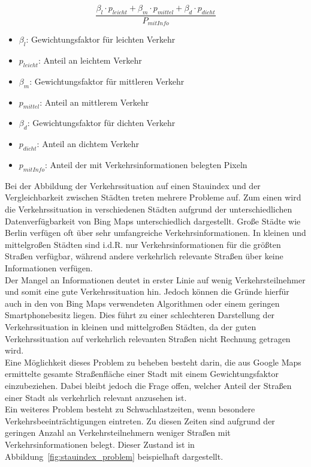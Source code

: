 \begin{equation}\label{eq:1}
\frac{\beta_l\cdot p_{leicht}+\beta_m\cdot p_{mittel}+\beta_d\cdot p_{dicht}}{P_{mit Info}}
\end{equation}
\begin{itemize}
\item $\beta_l$: Gewichtungsfaktor für leichten Verkehr
\item $p_{leicht}$: Anteil an leichtem Verkehr
\item $\beta_m$: Gewichtungsfaktor für mittleren Verkehr
\item $p_{mittel}$: Anteil an mittlerem Verkehr
\item $\beta_d$: Gewichtungsfaktor für dichten Verkehr
\item $p_{dicht}$: Anteil an dichtem Verkehr
\item $p_{mit Info}$: Anteil der mit Verkehrsinformationen belegten Pixeln
\end{itemize}

Bei der Abbildung der Verkehrssituation auf einen Stauindex und der Vergleichbarkeit zwischen Städten treten mehrere Probleme auf. Zum einen wird die Verkehrssituation in verschiedenen Städten aufgrund der unterschiedlichen Datenverfügbarkeit von Bing Maps unterschiedlich dargestellt. Große Städte wie Berlin verfügen oft über sehr umfangreiche Verkehrsinformationen. In kleinen und mittelgroßen Städten sind i.d.R. nur Verkehrsinformationen für die größten Straßen verfügbar, während andere verkehrlich relevante Straßen über keine Informationen verfügen.\\ Der Mangel an Informationen deutet in erster Linie auf wenig Verkehrsteilnehmer und somit eine gute Verkehrssituation hin. Jedoch können die Gründe hierfür auch in den von Bing Maps verwendeten Algorithmen oder einem geringen Smartphonebesitz liegen. Dies führt zu einer schlechteren Darstellung der Verkehrssituation in kleinen und mittelgroßen Städten, da der guten Verkehrssituation auf verkehrlich relevanten Straßen nicht Rechnung getragen wird.\\  
Eine Möglichkeit dieses Problem zu beheben besteht darin, die aus Google Maps ermittelte gesamte Straßenfläche einer Stadt mit einem Gewichtungsfaktor einzubeziehen. Dabei bleibt jedoch die Frage offen, welcher Anteil der Straßen einer Stadt als verkehrlich relevant anzusehen ist.\\
Ein weiteres Problem besteht zu Schwachlastzeiten, wenn besondere Verkehrsbeeinträchtigungen eintreten. Zu diesen Zeiten sind aufgrund der geringen Anzahl an Verkehrsteilnehmern weniger Straßen mit Verkehrsinformationen belegt. Dieser Zustand ist in Abbildung~\ref{fig:stauindex_problem} beispielhaft dargestellt. 

